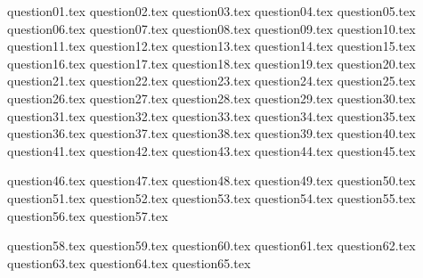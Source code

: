 \documentclass[a4paper, 11pt]{article}
\begin{document}
{question01.tex}
{question02.tex}
{question03.tex}
{question04.tex}
{question05.tex}
{question06.tex}
{question07.tex}
{question08.tex}
{question09.tex}
{question10.tex}
{question11.tex}
{question12.tex}
{question13.tex}
{question14.tex}
{question15.tex}
{question16.tex}
{question17.tex}
{question18.tex}
{question19.tex}
{question20.tex}
{question21.tex}
{question22.tex}
{question23.tex}
{question24.tex}
{question25.tex}
{question26.tex}
{question27.tex}
{question28.tex}
{question29.tex}
{question30.tex}
{question31.tex}
{question32.tex}
{question33.tex}
{question34.tex}
{question35.tex}
{question36.tex}
{question37.tex}
{question38.tex}
{question39.tex}
{question40.tex}
{question41.tex}
{question42.tex}
{question43.tex}
{question44.tex}
{question45.tex}

\renewcommand{\A}{\mathfrak{A}}
\renewcommand{\B}{\mathfrak{B}}

{question46.tex}
{question47.tex}
{question48.tex}
{question49.tex}
{question50.tex}
{question51.tex}
{question52.tex}
{question53.tex}
{question54.tex}
{question55.tex}
{question56.tex}
{question57.tex}

\renewcommand{\A}{\mathcal{A}}
\renewcommand{\B}{\mathcal{B}}

{question58.tex}
{question59.tex}
{question60.tex}
{question61.tex}
{question62.tex}
{question63.tex}
{question64.tex}
{question65.tex}
\end{document}
